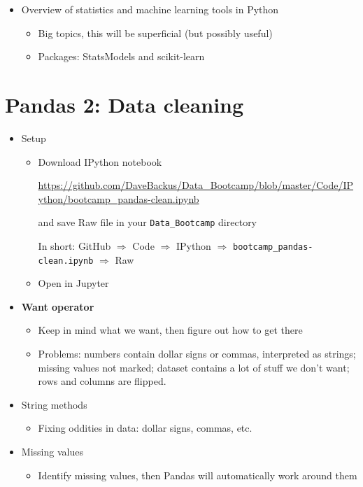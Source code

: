 \documentclass[11pt]{article}
\begin{document}
\begin{itemize}
\item Overview of statistics and machine learning tools in Python
\begin{itemize}
\item Big topics, this will be superficial (but possibly useful)
\item Packages:  StatsModels and scikit-learn
\end{itemize}

\end{itemize}

\section*{Pandas 2:  Data cleaning}

\begin{itemize}
\item Setup
\begin{itemize}
\item Download IPython notebook

\url{https://github.com/DaveBackus/Data_Bootcamp/blob/master/Code/IPython/bootcamp_pandas-clean.ipynb}

and save Raw file in your \verb|Data_Bootcamp| directory

In short:  GitHub $\Rightarrow$ Code $\Rightarrow$ IPython $\Rightarrow$
 \verb|bootcamp_pandas-clean.ipynb| $\Rightarrow$ Raw

\item Open in Jupyter
\end{itemize}

\item {\bf Want operator}
\begin{itemize}
\item Keep in mind what we want, then figure out how to get there
\item Problems:  numbers contain dollar signs or commas, interpreted as strings;
missing values not marked; 
dataset contains a lot of stuff we don't want; rows and columns are flipped.
\end{itemize}

\item String methods
\begin{itemize}
\item Fixing oddities in data:  dollar signs, commas, etc.
\end{itemize}

\item Missing values
\begin{itemize}
\item Identify missing values, then Pandas will automatically work around them
\end{itemize}


\end{itemize}
\end{document}
